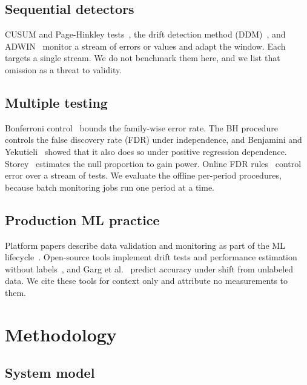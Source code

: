 \documentclass[journal]{IEEEtran}
\begin{document}
\subsection{Sequential detectors}

CUSUM and Page-Hinkley tests~\cite{page1954}, the drift detection method (DDM)~\cite{gama2004}, and ADWIN~\cite{bifet2007} monitor a stream of errors or values and adapt the window. Each targets a single stream. We do not benchmark them here, and we list that omission as a threat to validity.

\subsection{Multiple testing}

Bonferroni control~\cite{dunn1961} bounds the family-wise error rate. The BH procedure~\cite{benjamini1995} controls the false discovery rate (FDR) under independence, and Benjamini and Yekutieli~\cite{benjamini2001} showed that it also does so under positive regression dependence. Storey~\cite{storey2002} estimates the null proportion to gain power. Online FDR rules~\cite{javanmard2018,ramdas2017online} control error over a stream of tests. We evaluate the offline per-period procedures, because batch monitoring jobs run one period at a time.

\subsection{Production ML practice}

Platform papers describe data validation and monitoring as part of the ML lifecycle~\cite{baylor2017,polyzotis2018,schelter2018,breck2017}. Open-source tools implement drift tests and performance estimation without labels~\cite{evidently,alibidetect,nannyml}, and Garg et al.~\cite{garg2022} predict accuracy under shift from unlabeled data. We cite these tools for context only and attribute no measurements to them.

\section{Methodology}
\label{sec:method}

\subsection{System model}
\end{document}
